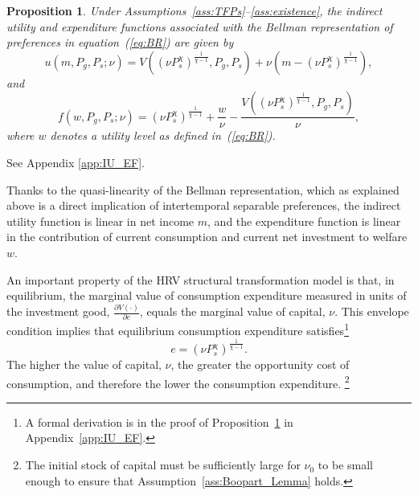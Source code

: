 \documentclass[12pt,a4paper]{article}
\newtheorem{proposition}{Proposition}
\begin{document}
\begin{proposition}\label{prop:IU_EF}
Under Assumptions~\ref{ass:TFPs}--\ref{ass:existence}, the indirect utility and expenditure functions associated with the Bellman representation of preferences in equation~\textnormal{(\ref{eq:BR})} are given by
\begin{equation}\label{eq:indirect}
u(m, P_{g}, P_{s}; \nu) = 
V\left( \left( \nu P_{s}^\chi \right)^{\frac{1}{\chi - 1}}, P_{g}, P_{s} \right)
+ \nu \left( m - \left( \nu P_{s}^\chi \right)^{\frac{1}{\chi - 1}} \right),
\end{equation}
and
\begin{equation}\label{eq:expenditure}
f(w, P_{g}, P_{s}; \nu) = 
\left( \nu P_{s}^\chi \right)^{\frac{1}{\chi - 1}} 
+ \frac{w}{\nu}
- \frac{ V\left( \left( \nu P_{s}^\chi \right)^{\frac{1}{\chi - 1}}, P_{g}, P_{s} \right) }{\nu},
\end{equation}
where \( w \) denotes a utility level as defined in~(\ref{eq:BR}).
\end{proposition}

 See Appendix \ref{app:IU_EF}.

Thanks to the quasi-linearity of the Bellman representation, which as explained above is a direct implication of intertemporal separable preferences,  
the indirect utility function is linear in net income \( m \),  
and the expenditure function is linear in the contribution of current consumption and current net investment to welfare \( w \).

An important property of the HRV structural transformation model is that, in equilibrium, the marginal value of consumption expenditure measured in units of the investment good, \( \frac{\partial V(\cdot)}{\partial e} \), equals the marginal value of capital, \( \nu \). This envelope condition implies that equilibrium 
consumption expenditure satisfies\footnote{A formal derivation is in the proof of Proposition~\ref{prop:IU_EF} in Appendix~\ref{app:IU_EF}.}  
\begin{equation}\label{eq:e}
e = \left( \nu P_{s}^\chi \right)^{\frac{1}{\chi - 1}} .
\end{equation}
The higher the value of capital, \( \nu \), the greater the opportunity cost of consumption, and therefore the lower the consumption expenditure.%
\footnote{The initial stock of capital must be sufficiently large for \( \nu_0 \) to be small enough to ensure that Assumption~\ref{ass:Boopart_Lemma} holds.}
\end{document}
